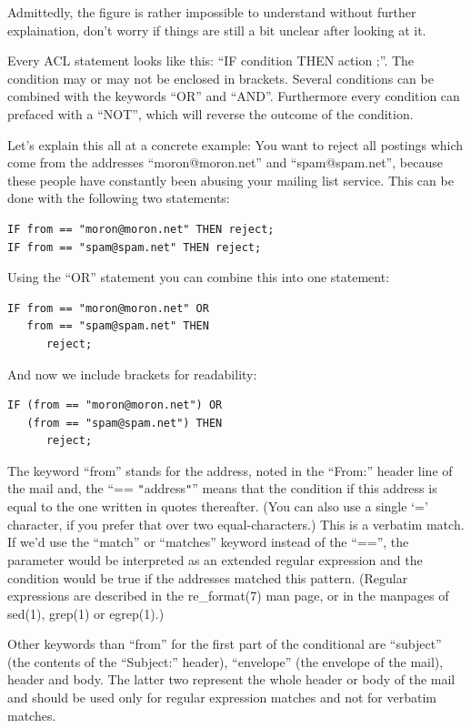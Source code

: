 \documentclass[a4paper,10pt]{scrreprt}
\begin{document}
Admittedly, the figure is rather impossible to understand without
further explaination, don't worry if things are still a bit unclear
after looking at it.

Every ACL statement looks like this: ``IF condition THEN action ;''.
The condition may or may not be enclosed in brackets. Several
conditions can be combined with the keywords ``OR'' and ``AND''.
Furthermore every condition can prefaced with a ``NOT'', which will
reverse the outcome of the condition.

Let's explain this all at a concrete example: You want to reject all
postings which come from the addresses ``moron@moron.net'' and
``spam@spam.net'', because these people have constantly been abusing
your mailing list service. This can be done with the following two
statements:
\begin{verbatim}
IF from == "moron@moron.net" THEN reject;
IF from == "spam@spam.net" THEN reject;
\end{verbatim}

Using the ``OR'' statement you can combine this into one statement:
\begin{verbatim}
IF from == "moron@moron.net" OR
   from == "spam@spam.net" THEN
      reject;
\end{verbatim}

And now we include brackets for readability:
\begin{verbatim}
IF (from == "moron@moron.net") OR
   (from == "spam@spam.net") THEN
      reject;
\end{verbatim}

The keyword ``from'' stands for the address, noted in the ``From:''
header line of the mail and, the ``== {\tt "}address{\tt "}'' means
that the condition if this address is equal to the one written in
quotes thereafter. (You can also use a single `=' character, if you
prefer that over two equal-characters.) This is a verbatim match. If
we'd use the ``match'' or ``matches'' keyword instead of the ``=='',
the parameter would be interpreted as an extended regular expression
and the condition would be true if the addresses matched this pattern.
(Regular expressions are described in the re\_format(7) man page, or
in the manpages of sed(1), grep(1) or egrep(1).)

Other keywords than ``from'' for the first part of the conditional are
``subject'' (the contents of the ``Subject:'' header), ``envelope''
(the envelope of the mail), header and body. The latter two represent
the whole header or body of the mail and should be used only for
regular expression matches and not for verbatim matches.
\end{document}
